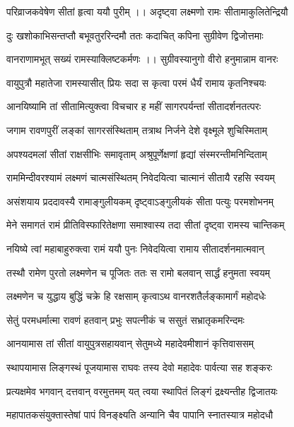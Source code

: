 \twolineshloka
{परिव्राजकवेषेण सीतां हृत्वा ययौ पुरीम् ।।}
{अदृष्ट्वा लक्ष्मणो रामः सीतामाकुलितेन्द्रियौ} %

\twolineshloka
{दुः खशोकाभिसन्तप्तौ बभूवतुररिन्दमौ}
{ततः कदाचित् कपिना सुग्रीवेण द्विजोत्तमाः} %

\twolineshloka
{वानराणामभूत् सख्यं रामस्याक्लिष्टकर्मणः ।।}
{सुग्रीवस्यानुगो वीरो हनुमान्नाम वानरः} %

\twolineshloka
{वायुपुत्रौ महातेजा रामस्यासीत् प्रियः सदा}
{स कृत्वा परमं धैर्यं रामाय कृतनिश्चयः} %

\twolineshloka
{आनयिष्यामि तां सीतामित्युक्त्वा विचचार ह}
{महीं सागरपर्यन्तां सीतादर्शनतत्परः} %

\twolineshloka
{जगाम रावणपुरीं लङ्कां सागरसंस्थिताम्}
{तत्राथ निर्जने देशे वृक्ष्मूले शुचिस्मिताम्} %

\twolineshloka
{अपश्यदमलां सीतां राक्षसीभिः समावृताम्}
{अश्रुपूर्णेक्षणां हृद्यां संस्मरन्तीमनिन्दिताम्} %

\twolineshloka
{राममिन्दीवरश्यामं लक्ष्मणं चात्मसंस्थितम्}
{निवेदयित्वा चात्मानं सीतायै रहसि स्वयम्} %

\twolineshloka
{असंशयाय प्रददावस्यै रामाङ्‌गुलीयकम्}
{दृष्ट्वाऽङ्‌गुलीयकं सीता पत्युः परमशोभनम्} %

\twolineshloka
{मेने समागतं रामं प्रीतिविस्फारितेक्षणा}
{समाश्वास्य तदा सीतां दृष्ट्वा रामस्य चान्तिकम्} %

\twolineshloka
{नयिष्ये त्वां महाबाहुरुक्त्वा रामं ययौ पुनः}
{निवेदयित्वा रामाय सीतादर्शनमात्मवान्} %

\twolineshloka
{तस्थौ रामेण पुरतो लक्ष्मणेन च पूजितः}
{ततः स रामो बलवान् सार्द्धं हनुमता स्वयम्} %

\twolineshloka
{लक्ष्मणेन च युद्धाय बुद्धिं चक्रे हि रक्षसाम्}
{कृत्वाऽथ वानरशतैर्लङ्कामार्गं महोदधेः} %

\twolineshloka
{सेतुं परमधर्मात्मा रावणं हतवान् प्रभुः}
{सपत्नीकं च ससुतं सभ्रातृकमरिन्दमः} %

\twolineshloka
{आनयामास तां सीतां वायुपुत्रसहायवान्}
{सेतुमध्ये महादेवमीशानं कृत्तिवाससम्} %

\twolineshloka
{स्थापयामास लिङ्गस्थं पूजयामास राघवः}
{तस्य देवो महादेवः पार्वत्या सह शङ्करः} %

\twolineshloka
{प्रत्यक्षमेव भगवान् दत्तवान् वरमुत्तमम्}
{यत् त्वया स्थापितं लिङ्गं द्रक्ष्यन्तीह द्विजातयः} %

\twolineshloka
{महापातकसंयुक्तास्तेषां पापं विनङ्क्ष्यति}
{अन्यानि चैव पापानि स्नातस्यात्र महोदधौ} %

